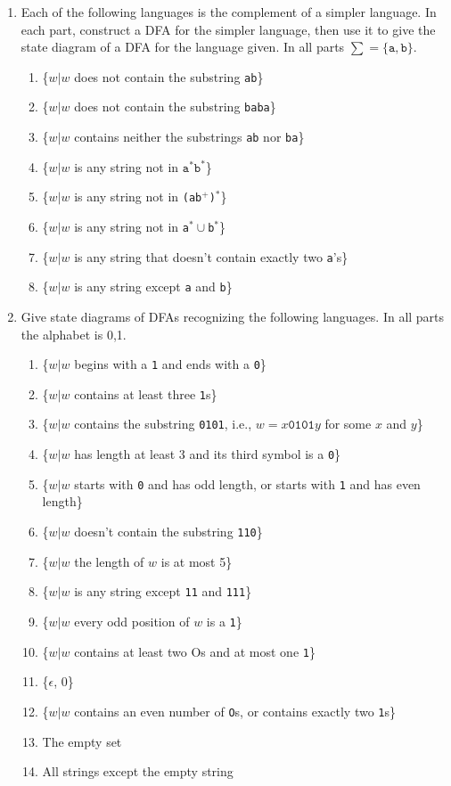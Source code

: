 \documentclass{article}
\begin{document}
\begin{enumerate}
\item Each of the following languages is the complement of a simpler language.
In each part, construct a DFA for the simpler language, then use it to give the
state diagram of a DFA for the language given. In all parts $\sum =
\{\texttt{a}, \texttt{b}\}$.

\begin{enumerate}
\item \{$w|w$ does not contain the substring \texttt{ab}\}
\item \{$w|w$ does not contain the substring \texttt{baba}\}
\item \{$w|w$ contains neither the substrings \texttt{ab} nor \texttt{ba}\}
\item \{$w|w$ is any string not in $\texttt{a}^* \texttt{b}^*$\}
\item \{$w|w$ is any string not in \texttt{(ab$^+$)$^*$}\}
\item \{$w|w$ is any string not in \texttt{a$^*\cup$b$^*$}\}
\item \{$w|w$ is any string that doesn't contain exactly two \texttt{a}'s\}
\item \{$w|w$ is any string except \texttt{a} and \texttt{b}\}
\end{enumerate}

\item Give state diagrams of DFAs recognizing the following languages. In all
parts the alphabet is {0,1}.

\begin{enumerate}
\item \{$w|w$ begins with a \texttt{1} and ends with a \texttt{0}\}
\item \{$w|w$ contains at least three \texttt{1}s\}
\item \{$w|w$ contains the substring \texttt{0101}, i.e., $w = x\texttt{0101}y$
for some $x$ and $y$\}
\item \{$w|w$ has length at least 3 and its third symbol is a \texttt{0}\}
\item \{$w|w$ starts with \texttt{0} and has odd length, or starts with
\texttt{1} and has even length\}
\item \{$w|w$ doesn't contain the substring \texttt{110}\}
\item \{$w|w$ the length of $w$ is at most 5\}
\item \{$w|w$ is any string except \texttt{11} and \texttt{111}\}
\item \{$w|w$ every odd position of $w$ is a \texttt{1}\}
\item \{$w|w$ contains at least two Os and at most one \texttt{1}\}
\item \{$\epsilon$, $0$\}
\item \{$w|w$ contains an even number of \texttt{O}s, or contains exactly two
\texttt{1}s\}
\item The empty set
\item All strings except the empty string
\end{enumerate}
    
\end{enumerate}
\end{document}
